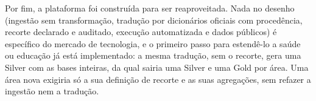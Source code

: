 Por fim, a plataforma foi construída para ser reaproveitada. Nada no desenho (ingestão sem transformação, tradução por dicionários oficiais com procedência, recorte declarado e auditado, execução automatizada e dados públicos) é específico do mercado de tecnologia, e o primeiro passo para estendê-lo a saúde ou educação já está implementado: a mesma tradução, sem o recorte, gera uma Silver com as bases inteiras, da qual sairia uma Silver e uma Gold por área. Uma área nova exigiria só a sua definição de recorte e as suas agregações, sem refazer a ingestão nem a tradução.
